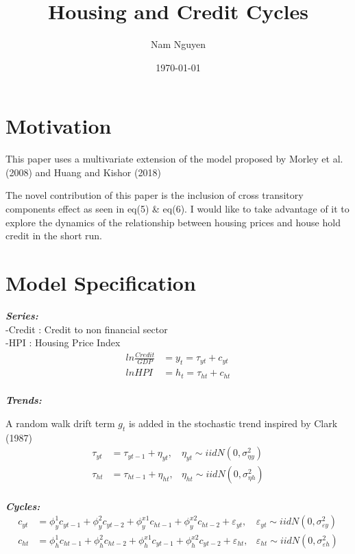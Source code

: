 \documentclass[fleqn]{article}
\title{Housing and Credit Cycles}
\author{Nam Nguyen}
\date{\today}
\begin{document}
	\maketitle
	
\begin{outline}[enumerate]

\section{Motivation}

This paper uses a multivariate extension of the model proposed by Morley et al. (2008) and Huang and Kishor (2018)

The novel contribution of this paper is the inclusion of cross transitory components effect as seen in eq(5) \& eq(6). I would like to take advantage of it to explore the dynamics of the relationship between housing prices and house hold credit in the short run.
		
\section {Model Specification}

\textbf{\textit{Series:}} \\
-Credit : Credit to non financial sector\\
-HPI : Housing Price Index
	\begin{align}
	ln \frac{Credit}{GDP} &= y_t = \tau_{yt} + c_{yt}
	\\
	ln HPI &= h_t = \tau_{ht} + c_{ht}
	\end{align}
	\\
\textbf{\textit{Trends:}}

A random walk drift term $g_t$ is added in the stochastic trend inspired by Clark (1987)
	\begin{align}
	\tau_{yt} &= \tau_{yt-1} + \eta_{yt}, &\eta_{yt} \sim iidN(0,\sigma^2_{\eta y})
	\\
	\tau_{ht} &= \tau_{ht-1} + \eta_{ht}, &\eta_{ht} \sim iidN(0,\sigma^2_{\eta h})	
	\end{align}
	\\
\textbf{\textit{Cycles:}}
	\begin{align}
	c_{yt} &= \phi^1_{y}c_{yt-1}  
		   + \phi^2_{y}c_{yt-2}  
		   + \phi^{x1}_{y}c_{ht-1} 
 		   + \phi^{x2}_{y}c_{ht-2} 
		   + \varepsilon_{yt},
		   &\varepsilon_{yt} \sim iidN(0,\sigma^2_{\varepsilon y})		   
	\\
	c_{ht} &= \phi^1_{h}c_{ht-1}  
		   + \phi^2_{h}c_{ht-2}
		   + \phi^{x1}_{h}c_{yt-1}
   		   + \phi^{x2}_{h}c_{yt-2}
	   	   + \varepsilon_{ht},
	   	   	&\varepsilon_{ht} \sim iidN(0,\sigma^2_{\varepsilon h})
	\end{align}
	\\



\end{outline}
\end{document}
